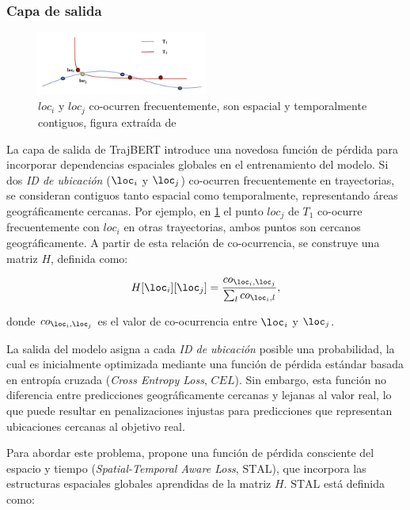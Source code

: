 \subsubsection{Capa de salida}
\label{stal_function}

\begin{figure}
  \centering
  \includegraphics[width=0.5\textwidth]{Graphics/co_ocurrent_trajectories.jpg}
  \caption{$loc_i$ y $loc_j$ co-ocurren frecuentemente, son espacial y temporalmente contiguos, figura extraída de \cite{si2023trajbert}}
  \label{fig:co_ocurrent_trajectories}
\end{figure}

La capa de salida de TrajBERT introduce una novedosa función de pérdida para incorporar dependencias espaciales globales en el entrenamiento del modelo. 
Si dos \textit{ID de ubicación} (\(\loc_i\) y \(\loc_j\)) co-ocurren frecuentemente en trayectorias, se consideran contiguos tanto espacial como temporalmente, representando áreas geográficamente cercanas. Por ejemplo, en \ref{fig:co_ocurrent_trajectories} el punto $loc_j$ de $T_1$ co-ocurre frecuentemente con $loc_i$ en otras trayectorias, ambos puntos son cercanos geográficamente. A partir de esta relación de co-ocurrencia, se construye una matriz \(H\), definida como:

\begin{equation}
H[\loc_i][\loc_j] = \frac{co_{\loc_i, \loc_j}}{\sum_{l} co_{\loc_i, l}},
\label{eq:co_ocurrence_matrix}
\end{equation}

\noindent
donde \(co_{\loc_i, \loc_j}\) es el valor de co-ocurrencia entre \(\loc_i\) y \(\loc_j\).

La salida del modelo asigna a cada \textit{ID de ubicación} posible una probabilidad, la cual es inicialmente optimizada mediante una función de pérdida estándar basada en entropía cruzada (\textit{Cross Entropy Loss}, \(CEL\)). Sin embargo, esta función no diferencia entre predicciones geográficamente cercanas y lejanas al valor real, lo que puede resultar en penalizaciones injustas para predicciones que representan ubicaciones cercanas al objetivo real.

Para abordar este problema, \cite{si2023trajbert} propone una función de pérdida consciente del espacio y tiempo (\textit{Spatial-Temporal Aware Loss}, \(\text{STAL}\)), que incorpora las estructuras espaciales globales aprendidas de la matriz \(H\). \(\text{STAL}\) está definida como:

